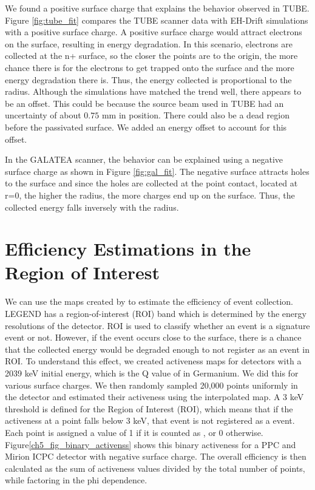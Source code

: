 We found a positive surface charge that explains the behavior observed in TUBE. Figure \ref{fig:tube_fit} compares the TUBE scanner data with EH-Drift simulations with a positive surface charge. A positive surface charge would attract electrons on the surface, resulting in energy degradation. In this scenario, electrons are collected at the n+ surface, so the closer the points are to the origin, the more chance there is for the electrons to get trapped onto the surface and the more energy degradation there is. Thus, the energy collected is proportional to the radius. Although the simulations have matched the trend well, there appears to be an offset. This could be because the source beam used in TUBE had an uncertainty of about $0.75$ mm in position. There could also be a dead region before the passivated surface. We added an energy offset to account for this offset.

In the GALATEA scanner, the behavior can be explained using a negative surface charge as shown in Figure \ref{fig:gal_fit}. The negative surface attracts holes to the surface and since the holes are collected at the point contact, located at r=0, the higher the radius, the more charges end up on the surface. Thus, the collected energy falls inversely with the radius.

\section{Efficiency Estimations in the Region of Interest}
\label{ch5_res_efficiency} 
We can use the maps created by {\ehd} to estimate the efficiency of {\onbb} event collection. LEGEND has a region-of-interest (ROI) band which is determined by the energy resolutions of the detector. ROI is used to classify whether an event is a signature event or not. However, if the event occurs close to the surface, there is a chance that the collected energy would be degraded enough to not register as an event in ROI. To understand this effect, we created activeness maps for detectors with a 2039 keV initial energy, which is the Q value of {\onbb} in Germanium. We did this for various surface charges. We then randomly sampled 20,000 points uniformly in the detector and estimated their activeness using the interpolated map. A 3 keV threshold is defined for the Region of Interest (ROI), which means that if the activeness at a point falls below 3 keV, that event is not registered as a {\onbb} event. Each point is assigned a value of 1 if it is counted as {\onbb}, or 0 otherwise. Figure\ref{ch5_fig_binary_activenss} shows this binary activeness for a PPC and Mirion ICPC detector with negative surface charge. The overall efficiency is then calculated as the sum of activeness values divided by the total number of points, while factoring in the phi dependence.

